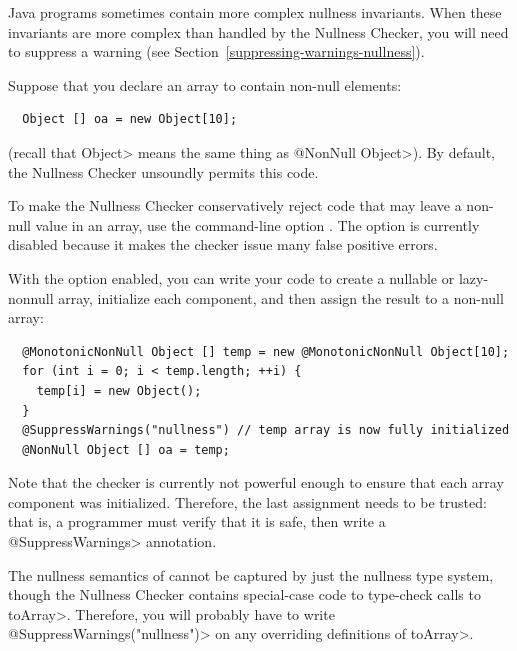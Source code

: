 Java programs sometimes contain more complex nullness invariants.  When
these invariants are more complex than handled by the Nullness Checker, you
will need to suppress a warning (see
Section~\ref{suppressing-warnings-nullness}).



Suppose that you declare an array to contain non-null elements:

\begin{Verbatim}
  Object [] oa = new Object[10];
\end{Verbatim}

\noindent
(recall that \<Object> means the same thing as \<@NonNull Object>).
By default, the Nullness Checker unsoundly permits this code.

To make the Nullness Checker conservatively reject code that may leave a
non-null value in an array, use the command-line option
.  The option is currently disabled
because it makes the checker issue many false positive errors.

With the option enabled, you can write your code to create a nullable or
lazy-nonnull array, initialize
each component, and then assign the result to a non-null array:

\begin{Verbatim}
  @MonotonicNonNull Object [] temp = new @MonotonicNonNull Object[10];
  for (int i = 0; i < temp.length; ++i) {
    temp[i] = new Object();
  }
  @SuppressWarnings("nullness") // temp array is now fully initialized
  @NonNull Object [] oa = temp;
\end{Verbatim}

Note that the checker is currently not powerful enough to ensure that
each array component was initialized. Therefore, the last assignment
needs to be trusted:  that is, a programmer must verify that it is safe,
then write a \<@SuppressWarnings> annotation.





The nullness semantics of
cannot be captured by just the nullness type system, though the Nullness
Checker contains special-case code to type-check calls to \<toArray>.
Therefore, you will probably have to write \<@SuppressWarnings("nullness")>
on any overriding definitions of \<toArray>.

